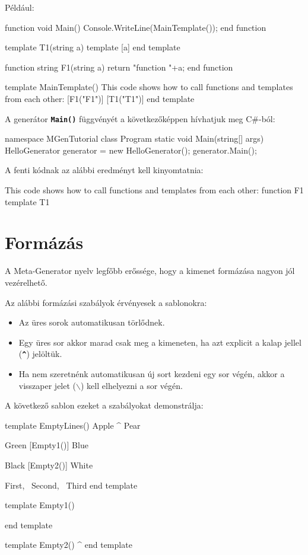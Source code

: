 \documentclass[12pt, a4paper]{report}
\newcommand{\ff}[1]{\textbf{\texttt{#1}}}
\begin{document}
Például:

\begin{mgencode}
function void Main()
  Console.WriteLine(MainTemplate());
end function

template T1(string a)
template [a]
end template

function string F1(string a)
  return "function "+a;
end function

template MainTemplate()
  This code shows how to call functions and 
  templates from each other:
    [F1("F1")]
    [T1("T1")]
end template
\end{mgencode}

A generátor \ff{Main()} függvényét a következőképpen hívhatjuk meg C\#-ból:

\begin{csharpcode}
namespace MGenTutorial
{
	class Program
	{
		static void Main(string[] args)
		{
			HelloGenerator generator = new HelloGenerator();
			generator.Main();
		}
	}
}
\end{csharpcode}

A fenti kódnak az alábbi eredményt kell kinyomtatnia:

\begin{textcode}
  This code shows how to call functions and
  templates from each other:
function F1
template T1
\end{textcode}

\section{Formázás}

A Meta-Generator nyelv legfőbb erőssége, hogy a kimenet formázása nagyon jól vezérelhető.

Az alábbi formázási szabályok érvényesek a sablonokra:
\begin{itemize}
	\item Az üres sorok automatikusan törlődnek.
	\item Egy üres sor akkor marad csak meg a kimeneten, ha azt explicit a kalap jellel (\ff{\^}) jelöltük.
	\item Ha nem szeretnénk automatikusan új sort kezdeni egy sor végén, akkor a visszaper jelet (\ff{$\backslash$}) kell elhelyezni a sor végén.
\end{itemize}

A következő sablon ezeket a szabályokat demonstrálja:

\begin{mgencode}
template EmptyLines()
  Apple
^
  Pear

  Green
  [Empty1()]
  Blue

  Black
  [Empty2()]
  White

  First, \
Second, \
Third
end template

template Empty1()

end template

template Empty2()
^
end template
\end{mgencode}
\end{document}
